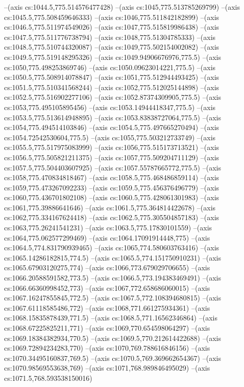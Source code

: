 --(axis cs:1044.5,775.514576477428)
--(axis cs:1045,775.513785269799)
--(axis cs:1045.5,775.508459646333)
--(axis cs:1046,775.511842182899)
--(axis cs:1046.5,775.511974549026)
--(axis cs:1047,775.515819986438)
--(axis cs:1047.5,775.511776738794)
--(axis cs:1048,775.51304785333)
--(axis cs:1048.5,775.510744320087)
--(axis cs:1049,775.502154002082)
--(axis cs:1049.5,775.519148295326)
--(axis cs:1049.94906676976,775.5)
--(axis cs:1050,775.498253869746)
--(axis cs:1050.09623014221,775.5)
--(axis cs:1050.5,775.508914078847)
--(axis cs:1051,775.512944493425)
--(axis cs:1051.5,775.510341568244)
--(axis cs:1052,775.512025144898)
--(axis cs:1052.5,775.516902277106)
--(axis cs:1052.87374309905,775.5)
--(axis cs:1053,775.495105895456)
--(axis cs:1053.14944418347,775.5)
--(axis cs:1053.5,775.513614948895)
--(axis cs:1053.83838727064,775.5)
--(axis cs:1054,775.494514103846)
--(axis cs:1054.5,775.497665270494)
--(axis cs:1054.72542530604,775.5)
--(axis cs:1055,775.503212733749)
--(axis cs:1055.5,775.517975083999)
--(axis cs:1056,775.515173713521)
--(axis cs:1056.5,775.505821211375)
--(axis cs:1057,775.509204711129)
--(axis cs:1057.5,775.504403607925)
--(axis cs:1057.55787665772,775.5)
--(axis cs:1058,775.470834818467)
--(axis cs:1058.5,775.468486859114)
--(axis cs:1059,775.473267092233)
--(axis cs:1059.5,775.456376496779)
--(axis cs:1060,775.436701802108)
--(axis cs:1060.5,775.428061301983)
--(axis cs:1061,775.39886641646)
--(axis cs:1061.5,775.364814422678)
--(axis cs:1062,775.334167624418)
--(axis cs:1062.5,775.305504857183)
--(axis cs:1063,775.26241541231)
--(axis cs:1063.5,775.17830101559)
--(axis cs:1064,775.062577299469)
--(axis cs:1064.17091914448,775)
--(axis cs:1064.5,774.831790939465)
--(axis cs:1065,774.580603763416)
--(axis cs:1065.14286182815,774.5)
--(axis cs:1065.5,774.151750910231)
--(axis cs:1065.67903120275,774)
--(axis cs:1066,773.679029706655)
--(axis cs:1066.20588591582,773.5)
--(axis cs:1066.5,773.194383469491)
--(axis cs:1066.66360998452,773)
--(axis cs:1067,772.658686060015)
--(axis cs:1067.16247855845,772.5)
--(axis cs:1067.5,772.108394680815)
--(axis cs:1067.61118585486,772)
--(axis cs:1068,771.661275934361)
--(axis cs:1068.15835878439,771.5)
--(axis cs:1068.5,771.16562346864)
--(axis cs:1068.67225825211,771)
--(axis cs:1069,770.654598064297)
--(axis cs:1069.18384382934,770.5)
--(axis cs:1069.5,770.212614422688)
--(axis cs:1069.72894234283,770)
--(axis cs:1070,769.788616846156)
--(axis cs:1070.34495160837,769.5)
--(axis cs:1070.5,769.369662654367)
--(axis cs:1070.98569553638,769)
--(axis cs:1071,768.989846495029)
--(axis cs:1071.5,768.593538150016)
